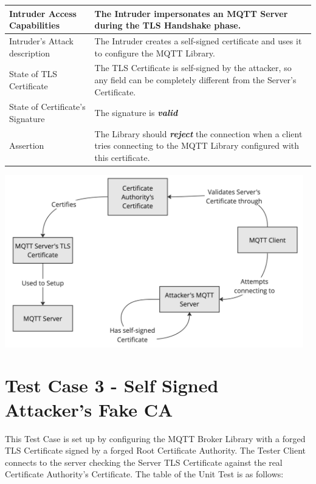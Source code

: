 \documentclass[binding=0.6cm,noexaminfo]{sapthesis}
\begin{document}
\begin{center}
\begin{tabular}{| p{6cm} | p{6cm} |}
\hline
Intruder Access Capabilities & The Intruder impersonates an MQTT Server during the TLS Handshake phase. \\
\hline
Intruder’s Attack description & The Intruder creates a self-signed certificate and uses it to configure the MQTT Library. \\
\hline
State of TLS Certificate & The TLS Certificate is self-signed by the attacker, so any field can be completely different from the Server’s Certificate. \\
\hline
State of Certificate’s Signature & The signature is \textbf{\textit{valid}} \\
\hline
Assertion & The Library should \textbf{\textit{reject}} the connection when a client tries connecting to the MQTT Library configured with this certificate. \\
\hline
\end{tabular}
\end{center}

\includegraphics[width=13cm]{TC2}

\section{Test Case 3 - Self Signed Attacker's Fake CA}
This Test Case is set up by configuring the MQTT Broker Library with a forged TLS Certificate signed by a forged Root Certificate Authority. The Tester Client connects to the server checking the Server TLS Certificate against the real Certificate Authority’s Certificate. The table of the Unit Test is as follows:
\end{document}
